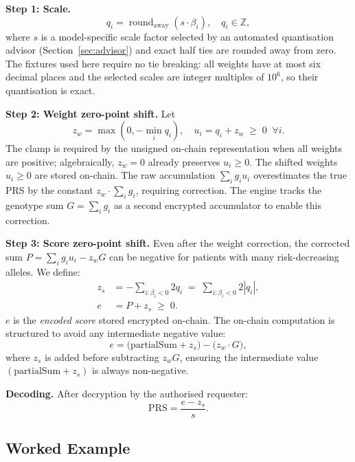 \documentclass[10pt,twocolumn]{article}
\begin{document}
\textbf{Step 1: Scale.}
\begin{equation}
q_i = \operatorname{round}_{\mathrm{away}}(s \cdot \beta_i), \quad q_i \in \mathbb{Z},
\end{equation}
where $s$ is a model-specific scale factor selected by an automated quantisation
advisor (Section~\ref{sec:advisor}) and exact half ties are rounded away from zero.
The fixtures used here require no tie breaking: all weights have at most six decimal
places and the selected scales are integer multiples of $10^6$, so their quantisation
is exact.

\textbf{Step 2: Weight zero-point shift.}  Let
\begin{equation}
z_w = \max(0,-\min_i q_i), \quad u_i = q_i + z_w \;\geq\; 0 \;\;\forall i.
\label{eq:wshift}
\end{equation}
The clamp is required by the unsigned on-chain representation when all weights are
positive; algebraically, $z_w=0$ already preserves $u_i\geq0$.  The shifted weights
$u_i \geq 0$ are stored on-chain.  The raw accumulation
$\sum_i g_i u_i$ overestimates the true PRS by the constant $z_w \cdot \sum_i g_i$,
requiring correction.  The engine tracks the genotype sum
$G = \sum_i g_i$ as a second encrypted accumulator to enable this correction.

\textbf{Step 3: Score zero-point shift.}
Even after the weight correction, the corrected sum
$P = \sum_i g_i u_i - z_w G$
can be negative for patients with many risk-decreasing alleles.  We define:
\begin{align}
z_s &= -\sum_{i:\beta_i<0} 2 q_i \;=\; \sum_{i:\beta_i<0} 2|q_i|,\\
e   &= P + z_s \;\geq\; 0.
\end{align}
$e$ is the \emph{encoded score} stored encrypted on-chain.  The on-chain
computation is structured to avoid any intermediate negative value:
\begin{equation}
e = \bigl(\mathrm{partialSum} + z_s\bigr) - \bigl(z_w \cdot G\bigr),
\label{eq:encode}
\end{equation}
where $z_s$ is added before subtracting $z_w G$, ensuring the intermediate
value $(\mathrm{partialSum} + z_s)$ is always non-negative.

\textbf{Decoding.}  After decryption by the authorised requester:
\begin{equation}
\mathrm{PRS} = \frac{e - z_s}{s}.
\end{equation}

\subsection{Worked Example}
\end{document}
